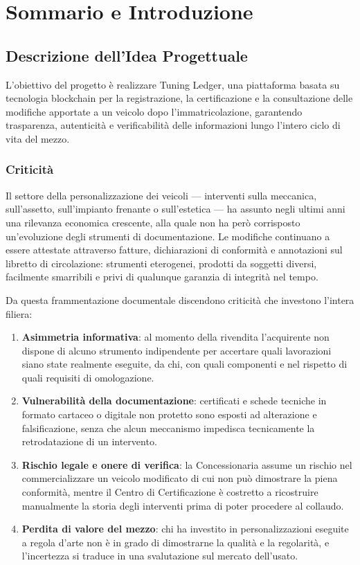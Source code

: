 \chapter{Sommario e Introduzione}

\section{Descrizione dell'Idea Progettuale}

L'obiettivo del progetto è realizzare Tuning Ledger, una piattaforma basata su tecnologia blockchain per la registrazione, la certificazione e la consultazione delle modifiche apportate a un veicolo dopo l'immatricolazione, garantendo trasparenza, autenticità e verificabilità delle informazioni lungo l'intero ciclo di vita del mezzo.

\subsection*{Criticit\`a}

Il settore della personalizzazione dei veicoli --- interventi sulla meccanica, sull'assetto, sull'impianto frenante o sull'estetica --- ha assunto negli ultimi anni una rilevanza economica crescente, alla quale non ha per\`o corrisposto un'evoluzione degli strumenti di documentazione. Le modifiche continuano a essere attestate attraverso fatture, dichiarazioni di conformit\`a e annotazioni sul libretto di circolazione: strumenti eterogenei, prodotti da soggetti diversi, facilmente smarribili e privi di qualunque garanzia di integrit\`a nel tempo.

Da questa frammentazione documentale discendono criticit\`a che investono l'intera filiera:

\begin{enumerate}
    \item \textbf{Asimmetria informativa}: al momento della rivendita l'acquirente non dispone di alcuno strumento indipendente per accertare quali lavorazioni siano state realmente eseguite, da chi, con quali componenti e nel rispetto di quali requisiti di omologazione.
    \item \textbf{Vulnerabilit\`a della documentazione}: certificati e schede tecniche in formato cartaceo o digitale non protetto sono esposti ad alterazione e falsificazione, senza che alcun meccanismo impedisca tecnicamente la retrodatazione di un intervento.
    \item \textbf{Rischio legale e onere di verifica}: la Concessionaria assume un rischio nel commercializzare un veicolo modificato di cui non pu\`o dimostrare la piena conformit\`a, mentre il Centro di Certificazione \`e costretto a ricostruire manualmente la storia degli interventi prima di poter procedere al collaudo.
    \item \textbf{Perdita di valore del mezzo}: chi ha investito in personalizzazioni eseguite a regola d'arte non \`e in grado di dimostrarne la qualit\`a e la regolarit\`a, e l'incertezza si traduce in una svalutazione sul mercato dell'usato.
\end{enumerate}

